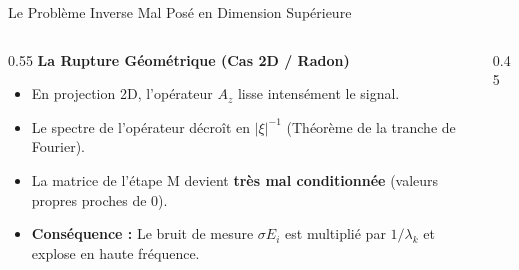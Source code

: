 \begin{frame}{Le Problème Inverse Mal Posé en Dimension Supérieure}
    \begin{columns}[c]
        \begin{column}{0.55\textwidth}
            \large\textbf{La Rupture Géométrique (Cas 2D / Radon)}\\[0.2cm]
            \normalsize
            \begin{itemize}
                \item En projection 2D, l'opérateur $A_z$ lisse intensément le signal.
                \item Le spectre de l'opérateur décroît en \alert{$|\xi|^{-1}$} (Théorème de la tranche de Fourier).
                \item La matrice de l'étape M devient \textbf{très mal conditionnée} (valeurs propres proches de 0).
                \item \textbf{Conséquence :} Le bruit de mesure $\sigma E_i$ est multiplié par $1/\lambda_k$ et explose en haute fréquence.
            \end{itemize}
        \end{column}
        \begin{column}{0.45\textwidth}
            \centering
        \end{column}
    \end{columns}
\end{frame}